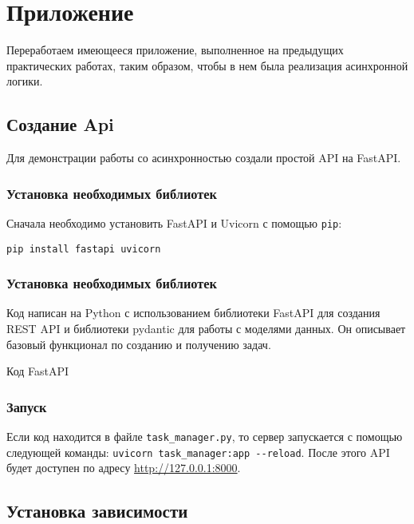 \section{Приложение}

Переработаем имеющееся приложение,
выполненное на предыдущих практических работах, таким образом,
чтобы в нем была реализация асинхронной логики.

\subsection{Создание Api}

Для демонстрации работы со асинхронностью создали простой API
на FastAPI.

\subsubsection{Установка необходимых библиотек}

Сначала необходимо установить FastAPI и Uvicorn с помощью \texttt{pip}:

\begin{verbatim}
pip install fastapi uvicorn
\end{verbatim}

\subsubsection{Установка необходимых библиотек}

Код  написан на Python с использованием библиотеки FastAPI
для создания REST API и библиотеки pydantic для работы с моделями данных.
Он описывает базовый функционал по созданию и получению задач.

\begin{image}
	\caption{Код FastAPI}
	\label{fig:fastapi}
\end{image}

\subsubsection{Запуск}

Если код находится в файле \texttt{task\_manager.py},
то сервер запускается с помощью следующей команды:
\verb|uvicorn task_manager:app --reload|.
После этого API будет доступен по адресу \url{http://127.0.0.1:8000}.

\subsection{Установка зависимости}

